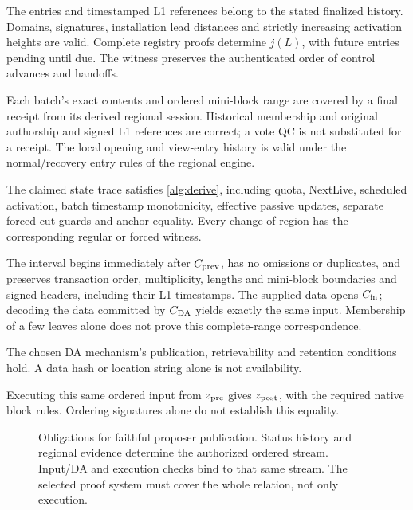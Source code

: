 \documentclass[11pt,a4paper,onecolumn]{article}
\begin{document}
\begin{description}[style=nextline,leftmargin=1em,labelindent=0pt]
\item[$\mathcal R_{\rm registry}$: authenticated control.]
The entries and timestamped L1 references belong to the stated finalized
history. Domains, signatures, installation lead distances and strictly
increasing activation heights are valid. Complete registry proofs
determine $j(L)$, with future entries pending until due. The witness
preserves the authenticated order of control advances and handoffs.
\item[$\mathcal R_{\rm source}$: regional consensus.]
Each batch's exact contents and ordered mini-block range are covered by a
final receipt from its derived regional session. Historical membership and
original authorship and signed L1 references are correct; a vote QC is not
substituted for a receipt. The local opening and view-entry history is valid
under the normal/recovery entry rules of the regional engine.
\item[$\mathcal R_{\rm rotation}$: authorized succession.]
The claimed state trace satisfies \cref{alg:derive}, including quota,
NextLive, scheduled activation, batch timestamp monotonicity, effective
passive updates, separate forced-cut guards and anchor equality.
Every change of region has the corresponding regular or forced witness.
\item[$\mathcal R_{\rm input}$: faithful ordered data.]
The interval begins immediately after $C_{\rm prev}$, has no omissions or
duplicates, and preserves transaction order, multiplicity, lengths and
mini-block boundaries and signed headers, including their L1 timestamps.
The supplied data opens $C_{\rm in}$; decoding the
data committed by $C_{\rm DA}$ yields exactly the same input. Membership
of a few leaves alone does not prove this complete-range correspondence.
\item[$\mathcal R_{\rm DA}$: availability.]
The chosen DA mechanism's publication, retrievability and retention
conditions hold. A data hash or location string alone is not availability.
\item[$\mathcal R_{\rm exec}$: execution.]
Executing this same ordered input from $z_{\rm pre}$ gives $z_{\rm post}$,
with the required native block rules. Ordering signatures alone do not
establish this equality.
\end{description}

\begin{figure}[htbp]\centering

\caption{Obligations for faithful proposer publication. Status history and
regional evidence determine the authorized ordered stream. Input/DA and
execution checks bind to that same stream. The selected proof system must
cover the whole relation, not only execution.}
\label{fig:derivation}
\end{figure}
\end{document}
